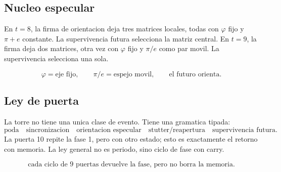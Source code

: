 \subsection*{Nucleo especular}
En \(t=8\), la firma de orientacion deja tres matrices locales, todas con \(\varphi\) fijo y \(\pi+e\) constante. La supervivencia futura selecciona la matriz central. En \(t=9\), la firma deja dos matrices, otra vez con \(\varphi\) fijo y \(\pi/e\) como par movil. La supervivencia selecciona una sola.

\[
\boxed{\varphi=\text{eje fijo},\qquad \pi/e=\text{espejo movil},\qquad \text{el futuro orienta.}}
\]

\subsection*{Ley de puerta}
La torre no tiene una unica clase de evento. Tiene una gramatica tipada:
\[
\boxed{\text{poda}}
\quad
\boxed{\text{sincronizacion}}
\quad
\boxed{\text{orientacion especular}}
\quad
\boxed{\text{stutter/reapertura}}
\quad
\boxed{\text{supervivencia futura}}.
\]
La puerta 10 repite la fase 1, pero con otro estado; esto es exactamente el retorno con memoria. La ley general no es periodo, sino ciclo de fase con carry.

\[
\boxed{\text{cada ciclo de 9 puertas devuelve la fase, pero no borra la memoria.}}
\]
